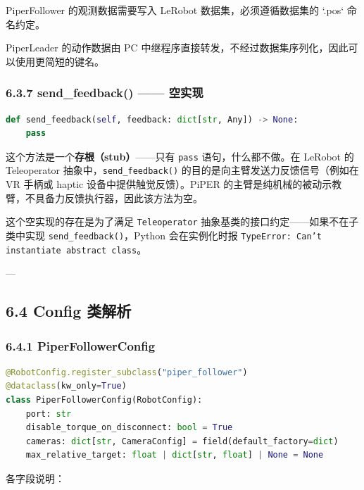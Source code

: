 \documentclass[UTF8,a4paper,11pt]{ctexart}
\begin{document}
{\item PiperFollower 的观测数据需要写入 LeRobot 数据集，必须遵循数据集的 `.pos` 命名约定。
\item PiperLeader 的动作数据由 PC 中继程序直接转发，不经过数据集序列化，因此可以使用更简短的键名。

\subsubsection{6.3.7 send_feedback() —— 空实现}

\begin{lstlisting}[language=python]
def send_feedback(self, feedback: dict[str, Any]) -> None:
    pass
\end{lstlisting}

这个方法是一个\textbf{存根（stub）}——只有 \texttt{pass} 语句，什么都不做。在 LeRobot 的 Teleoperator 抽象中，\texttt{send_feedback()} 的目的是向主臂发送力反馈信号（例如在 VR 手柄或 haptic 设备中提供触觉反馈）。PiPER 的主臂是纯机械的被动示教臂，不具备力反馈执行器，因此该方法为空。

这个空实现的存在是为了满足 \texttt{Teleoperator} 抽象基类的接口约定——如果不在子类中实现 \texttt{send_feedback()}，Python 会在实例化时报 \texttt{TypeError: Can't instantiate abstract class}。

---

\subsection{6.4 Config 类解析}

\subsubsection{6.4.1 PiperFollowerConfig}

\begin{lstlisting}[language=python]
@RobotConfig.register_subclass("piper_follower")
@dataclass(kw_only=True)
class PiperFollowerConfig(RobotConfig):
    port: str
    disable_torque_on_disconnect: bool = True
    cameras: dict[str, CameraConfig] = field(default_factory=dict)
    max_relative_target: float | dict[str, float] | None = None
\end{lstlisting}

各字段说明：

}
\end{document}
